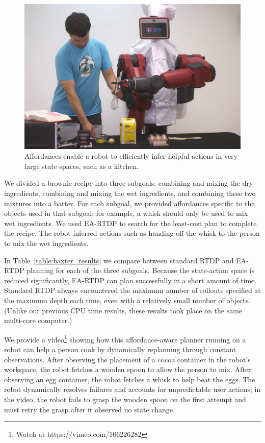\documentclass[letterpaper]{article}
\begin{document}

\begin{figure}[b]
\centering
\includegraphics[width=0.75\linewidth]{figures/baxter.jpg}%
  \caption{Affordances enable a robot to efficiently infer helpful actions in
    very large state spaces, such as a kitchen.}
  \label{fig:baxter_results}
\end{figure}

We divided a brownie recipe into three subgoals: combining and mixing
the dry ingredients, combining and mixing the wet ingredients, and
combining these two mixtures into a batter. For each subgoal, we
provided affordances specific to the objects used in that subgoal; for
example, a whisk should only be used to mix wet ingredients.  We used
EA-RTDP to search for the least-cost plan to complete the recipe.  The
robot inferred actions such as handing off the whisk to the person to
mix the wet ingredients.


In Table~\ref{table:baxter_results} we compare between standard RTDP
and EA-RTDP planning for each of the three subgoals. Because the
state-action space is reduced significantly, EA-RTDP can plan
successfully in a short amount of time. Standard RTDP always
encountered the maximum number of rollouts specified at the maximum
depth each time, even with a relatively small number of objects.
(Unlike our previous CPU time results, these results took place on the
same multi-core computer.)

We provide a video\footnote{Watch at https://vimeo.com/106226282} 
showing how this affordance-aware planner running
on a robot can help a person cook by dynamically replanning through
constant observations. After observing the placement of a cocoa
container in the robot's workspace, the robot fetches a wooden spoon
to allow the person to mix. After observing an egg container, the
robot fetches a whisk to help beat the eggs. 
The robot dynamically resolves failures and accounts for unpredictable
user actions; in the video, the robot fails to grasp the wooden spoon on
the first attempt and must retry the grasp after it observed no state
change.
\end{document}
